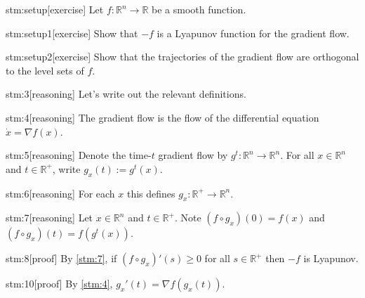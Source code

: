 
\begin{stm}{stm:setup}[exercise]
Let $f : \mathbb{R}^n \to \mathbb{R}$ be a smooth function. 
\end{stm}

\begin{stm}{stm:setup1}[exercise]
Show that $-f$ is a Lyapunov function for the gradient flow.
\end{stm}
    
\begin{stm}{stm:setup2}[exercise]
Show that the trajectories of the gradient flow are orthogonal to the level sets of $f$.
\end{stm}


\begin{stm}{stm:3}[reasoning]
Let's write out the relevant definitions.
\end{stm}

\begin{stm}{stm:4}[reasoning]
The gradient flow is the flow of the differential equation $\dot{x} = \nabla f(x)$.
\end{stm}

\begin{stm}{stm:5}[reasoning]
Denote the time-$t$ gradient flow by $g^t : \mathbb{R}^n \to \mathbb{R}^n$. For all $x \in \mathbb{R}^n$ and $t \in \mathbb{R}^+$, write $g_x(t) := g^t(x)$.
\end{stm}

\begin{stm}{stm:6}[reasoning]
For each $x$ this defines $g_x : \mathbb{R}^+ \to \mathbb{R}^n$.
\end{stm}

\begin{stm}{stm:7}[reasoning]
Let $x \in \mathbb{R}^n$ and $t \in \mathbb{R}^+$. Note $(f \circ g_x)(0) = f(x)$ and $(f \circ g_x)(t) = f(g^t(x))$.
\end{stm}

\begin{stm}{stm:8}[proof]
By \ref{stm:7}, if $(f \circ g_x)'(s) \ge 0$ for all $s \in \mathbb{R}^+$ then $-f$ is Lyapunov.
\end{stm}

\begin{stm}{stm:10}[proof]
By \ref{stm:4}, $g_x'(t) = \nabla f(g_x(t))$. 
\end{stm}

